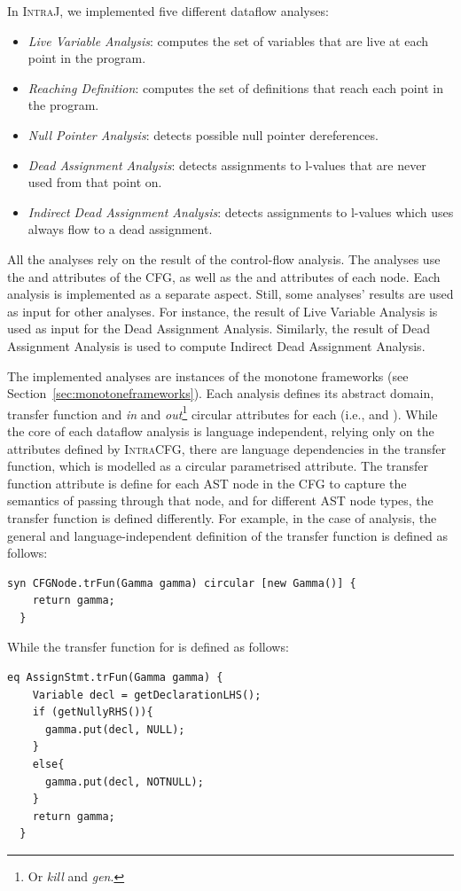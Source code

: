 In \textsc{IntraJ}, we implemented five different dataflow analyses:
\begin{itemize}
  \item \emph{Live Variable Analysis}: computes the set of variables that are live at each point in the program.
  \item \emph{Reaching Definition}: computes the set of definitions that reach each point in the program.
  \item \emph{Null Pointer Analysis}: detects possible null pointer dereferences.
  \item \emph{Dead Assignment Analysis}: detects assignments to l-values that are never used from that point on.
  \item \emph{Indirect Dead Assignment Analysis}: detects assignments to l-values which uses always flow to a dead assignment.
\end{itemize}
All the analyses rely on the result of the control-flow analysis. The analyses use
the  and  attributes of the CFG, as well as the  and 
attributes of each node.
Each analysis is implemented as a separate aspect.
Still, some analyses' results are used as input for other analyses. For instance,
the result of Live Variable Analysis is used as input for the Dead Assignment Analysis.
Similarly, the result of Dead Assignment Analysis is used to compute Indirect Dead Assignment Analysis.

The implemented analyses are instances of the monotone frameworks (see Section~\ref{sec:monotoneframeworks}).
Each analysis defines its abstract domain, transfer function and \emph{in} and
\emph{out}\footnote{Or \emph{kill} and \emph{gen}.} circular attributes for each  (i.e.,  and  ).
While the core of each dataflow analysis is language independent, relying only on the
attributes defined by \textsc{IntraCFG}, there are language dependencies in the 
transfer function, which is modelled as a circular parametrised attribute.
The transfer function attribute is define for each AST node in the CFG to capture the semantics of passing
through that node, and for different AST node types, the transfer function is defined differently.
For example, in the case of  analysis,
the general and language-independent definition of the transfer function is
defined as follows:
\begin{lstlisting}[language=JastAdd]
  syn CFGNode.trFun(Gamma gamma) circular [new Gamma()] {
    return gamma;
  }
\end{lstlisting}
While the transfer function for  is defined as follows:
\begin{lstlisting}[language=JastAdd]
  eq AssignStmt.trFun(Gamma gamma) {
    Variable decl = getDeclarationLHS();
    if (getNullyRHS()){
      gamma.put(decl, NULL);
    }
    else{
      gamma.put(decl, NOTNULL);
    }
    return gamma;
  }
\end{lstlisting}


